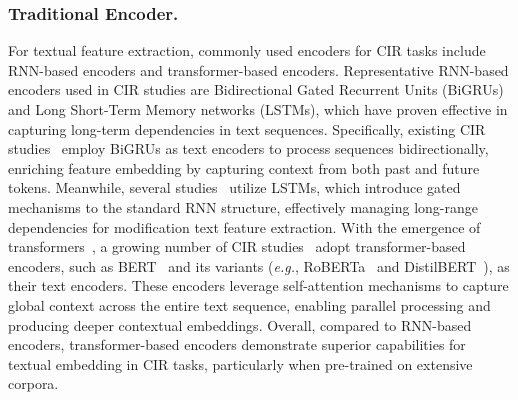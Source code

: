 \subsubsection{Traditional Encoder.}
For textual feature extraction, commonly used encoders for CIR tasks include RNN-based encoders and transformer-based encoders. Representative RNN-based encoders used in CIR studies are Bidirectional Gated Recurrent Units (BiGRUs)~\cite{cho2014learning} and Long Short-Term Memory networks (LSTMs), which have proven effective in capturing long-term dependencies in text sequences. Specifically, existing CIR studies~\cite{delmas2022artemis,li2023dscn,li2024cmap,li2023manme,tautkute2021Synth,zhang2020jamma, zhang2021GSCMR, wang2024NSFSE,li2023acnet,zhao2024neucore} employ BiGRUs as text encoders to process sequences bidirectionally, enriching feature embedding by capturing context from both past and future tokens. Meanwhile, several studies~\cite{zhang2022eer,huang2023lgli,xu2024alret,zhang2022tis,zhang2023MLCLSAP,yang2023crn,zhang2024mcem,dodds2020maaf,wu2024sdfn, zhang2021mcr} utilize LSTMs, which introduce gated mechanisms to the standard RNN structure, effectively managing long-range dependencies for modification text feature extraction. With the emergence of transformers~\cite{vaswani2017attention}, a growing number of CIR studies~\cite{jandial2022sac,anwaar2021ComposeAE, goenka2022fashionvlp,hu2023provla,han2022fashionvil,tian2023aacl, xu2023ComqueryFormer,song2024syncmask} adopt transformer-based encoders, such as BERT~\cite{devlin2019bert} and its variants (\textit{e.g.}, RoBERTa~\cite{liu2019roberta} and DistilBERT~\cite{sanh2019distilbert}), as their text encoders. These encoders leverage self-attention mechanisms to capture global context across the entire text sequence, enabling parallel processing and producing deeper contextual embeddings. Overall, compared to RNN-based encoders, transformer-based encoders demonstrate superior capabilities for textual embedding in CIR tasks, particularly when pre-trained on extensive corpora. 


